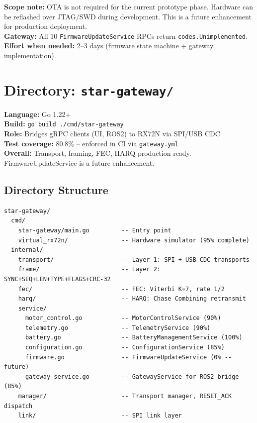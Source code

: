 \documentclass[12pt,a4paper]{article}
\begin{document}
\begin{warnbox}
  \textbf{Scope note:} OTA is not required for the current prototype phase. Hardware can be
  reflashed over JTAG/SWD during development. This is a future enhancement for production deployment.\\
  \textbf{Gateway:} All 10 \texttt{FirmwareUpdateService} RPCs return \texttt{codes.Unimplemented}.\\
  \textbf{Effort when needed:} 2--3 days (firmware state machine + gateway implementation).
\end{warnbox}

\newpage

\section{Directory: \texttt{star-gateway/}}

\begin{dirbox}
  \textbf{Language:} Go 1.22+\\
  \textbf{Build:} \texttt{go build ./cmd/star-gateway}\\
  \textbf{Role:} Bridges gRPC clients (UI, ROS2) to RX72N via SPI/USB CDC\\
  \textbf{Test coverage:} 80.8\% -- enforced in CI via \texttt{gateway.yml}\\
  \textbf{Overall:} Transport, framing, FEC, HARQ production-ready. FirmwareUpdateService is a future enhancement.
\end{dirbox}

\subsection{Directory Structure}

\begin{lstlisting}[caption={star-gateway/ layout}]
star-gateway/
  cmd/
    star-gateway/main.go         -- Entry point
    virtual_rx72n/               -- Hardware simulator (95% complete)
  internal/
    transport/                   -- Layer 1: SPI + USB CDC transports
    frame/                       -- Layer 2: SYNC+SEQ+LEN+TYPE+FLAGS+CRC-32
    fec/                         -- FEC: Viterbi K=7, rate 1/2
    harq/                        -- HARQ: Chase Combining retransmit
    service/
      motor_control.go           -- MotorControlService (90%)
      telemetry.go               -- TelemetryService (90%)
      battery.go                 -- BatteryManagementService (100%)
      configuration.go           -- ConfigurationService (85%)
      firmware.go                -- FirmwareUpdateService (0% -- future)
      gateway_service.go         -- GatewayService for ROS2 bridge (85%)
    manager/                     -- Transport manager, RESET_ACK dispatch
    link/                        -- SPI link layer
\end{lstlisting}
\end{document}
